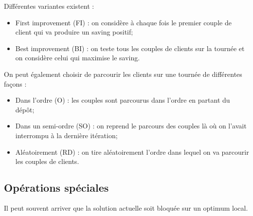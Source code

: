 \documentclass[a4paper,11pt]{article}%
\begin{document}
Différentes variantes existent :
\begin{itemize}
\item First improvement (FI) : on considère à chaque fois le premier couple de client qui va produire un saving positif;
\item Best improvement (BI) : on teste tous les couples de clients sur la tournée et on considère celui qui maximise le saving. \\
\end{itemize}

On peut également choisir de parcourir les clients sur une tournée de différentes façons :
\begin{itemize}
\item Dans l'ordre (O) : les couples sont parcourus dans l'ordre en partant du dépôt;
\item Dans un semi-ordre (SO) : on reprend le parcours des couples là où on l'avait interrompu à la dernière itération;
\item Aléatoirement (RD) : on tire aléatoirement l'ordre dans lequel on va parcourir les couples de clients. \\
\end{itemize}


\subsection*{Opérations spéciales}

Il peut souvent arriver que la solution actuelle soit bloquée sur un optimum local. 
\end{document}
